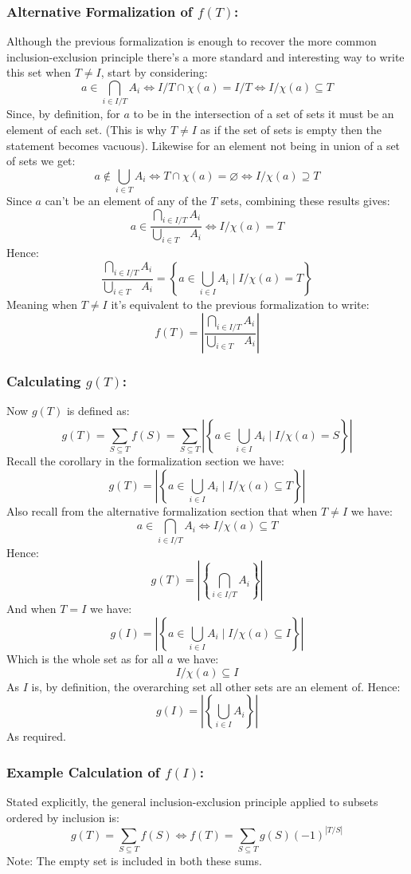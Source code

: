 \subsubsection{Alternative Formalization of $f(T)$:}
Although the previous formalization is enough to recover the more common inclusion-exclusion principle
there's a more standard and interesting way to write this set when $T\neq I$,
start by considering:
\[a\in\bigcap_{i\in I/T}A_i \Leftrightarrow I/T\cap \chi(a) = I/T \Leftrightarrow I/\chi(a)\subseteq T\] 
Since, by definition, for $a$ to be in the intersection of a set of sets it must be an element of each set.
(This is why $T\neq I$ as if the set of sets is empty then the statement becomes vacuous).
Likewise for an element not being in union of a set of sets we get:
\[a\not\in\bigcup_{i\in T}A_i \Leftrightarrow T\cap \chi(a) = \varnothing \Leftrightarrow I/\chi(a)\supseteq T\]
Since $a$ can't be an element of any of the $T$ sets, combining these results gives:
\[a\in\frac{\bigcap_{i\in I/T}A_i}{\bigcup_{i\in T\phantom{/T}} A_i}\Leftrightarrow I/\chi(a) = T\]
Hence:
\[\frac{\bigcap_{i\in I/T}A_i}{\bigcup_{i\in T\phantom{/T}} A_i}=\left\{a\in \bigcup_{i\in I}A_i \mid I/\chi(a) = T\right\}\]
Meaning when $T\neq I$ it's equivalent to the previous formalization to write:
\[f(T) = \left|\frac{\bigcap_{i\in I/T}A_i}{\bigcup_{i\in T\phantom{/T}} A_i}\right|\]

\subsubsection{Calculating $g(T)$:}
Now $g(T)$ is defined as:
\[g(T) = \sum_{S\subseteq T}f(S) = \sum_{S\subseteq T} \left|\left\{a\in \bigcup_{i\in I}A_i \mid I/\chi(a) = S\right\}\right|\]
Recall the corollary in the formalization section we have:
\[g(T)  =  \left|\left\{a\in \bigcup_{i\in I}A_i \mid I/\chi(a)\subseteq T\right\}\right|\]
Also recall from the alternative formalization section that when $T\neq I$ we have:
\[a\in\bigcap_{i\in I/T}A_i \Leftrightarrow I/\chi(a)\subseteq T\]
Hence:
\[g(T)  =  \left|\left\{\bigcap_{i\in I/T}A_i\right\}\right|\]
And when $T = I$ we have:
\[g(I)  =  \left|\left\{a\in \bigcup_{i\in I}A_i \mid I/\chi(a)\subseteq I\right\}\right|\]
Which is the whole set as for all $a$ we have:
\[I/\chi(a) \subseteq I\]
As $I$ is,
by definition,
the overarching set all other sets are an element of.
Hence:
\[g(I)  =  \left|\left\{\bigcup_{i\in I}A_i\right\}\right|\]
As required.

\subsubsection{Example Calculation of $f(I)$:}
Stated explicitly,
the general inclusion-exclusion principle applied to subsets ordered by inclusion is:
\[g(T) = \sum_{S\subseteq T}f(S) \Leftrightarrow f(T) = \sum_{S\subseteq T}g(S)(-1)^{|T/S|}\]
Note: The empty set is included in both these sums.
\\


